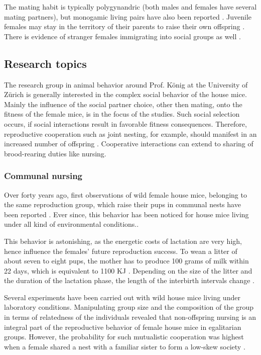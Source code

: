 The mating habit is typically polygynandric (both males and females have several mating partners), but monogamic living pairs have also been reported \citep{lidicker:76}. Juvenile females may stay in the territory of their parents to raise their own offspring \citep{petras:67}. There is evidence of stranger females immigrating into social groups as well \citep{anderson:65, reimer:67, selander:70, bronson:79, baker:81}.     

\subsection{Research topics}
\label{subsec:researchtopics}

The research group in animal behavior around Prof. K\"onig at the University of Z\"urich is generally interested in the complex social behavior of the house mice. Mainly the influence of the social partner choice, other then mating, onto the fitness of the female mice, is in the focus of the studies. Such social selection occurs, if social interactions result in favorable fitness consequences. Therefore, reproductive cooperation such as joint nesting, for example, should manifest in an increased number of offspring \citep{weidt:07}. Cooperative interactions can extend to sharing of brood-rearing duties like nursing.

\subsubsection{Communal nursing}
\label{subsubsec:comnurs}

Over forty years ago, first observations of wild female house mice, belonging to the same reproduction group, which raise their pups in communal nests have been reported \citep{southwick:55}. Ever since, this behavior has been noticed for house mice living under all kind of environmental conditions.\citep{crowcroft:63, sayler:69, gandelman:70, werboff:70, baker:81}.

This behavior is astonishing, as the energetic costs of lactation are very high, hence influence the females' future reproduction success. To wean a litter of about seven to eight pups, the mother has to produce 100 grams of milk within 22 days, which is equivalent to 1100 \acf{KJ} \citep{koenig:88}. Depending on the size of the litter and the duration of the lactation phase, the length of the interbirth intervals change \citep{fuchs:81, fuchs:82, koenig:87a, koenig:87b}.

Several experiments have been carried out with wild house mice living under laboratory conditions. Manipulating group size and the composition of the group in terms of relatedness of the individuals revealed that non-offspring nursing is an integral part of the reproductive behavior of female house mice in egalitarian groups. However, the probability for such mutualistic cooperation was highest when a female shared a nest with a familiar sister to form a low-skew society \citep{koenig:06}.


